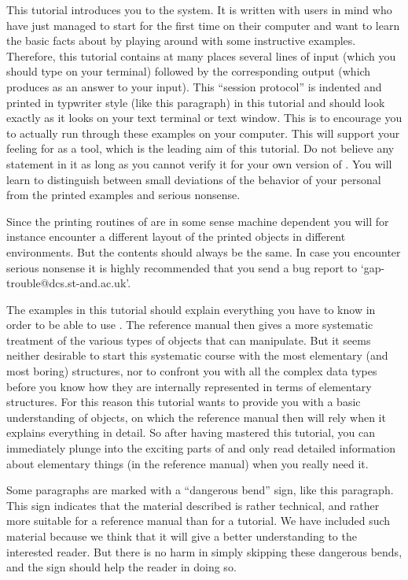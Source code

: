
This tutorial introduces you to  the {\GAP}  system.  It is written  with
users in mind who have just managed to start {\GAP} for the first time on
their computer and want to learn the basic facts  about {\GAP} by playing
around with some instructive  examples. Therefore, this tutorial contains
at many  places several lines of  input  (which you  should type  on your
terminal) followed by the corresponding output  (which {\GAP} produces as
an answer to your input).
\begintt
    This ``session protocol'' is indented and printed in typwriter style
    (like this paragraph) in this tutorial and should look exactly as it
    looks on your text terminal or text window.
\endtt
This is  to encourage you to actually  run through these examples on your
computer. This will support your  feeling for {\GAP}  as a tool, which is
the leading aim of this  tutorial. Do not believe any  statement in it as
long  as you cannot verify  it for your own  version of  {\GAP}. You will
learn to distinguish  between small  deviations of  the behavior of  your
personal {\GAP} from the printed examples and serious nonsense.

Since the printing routines of {\GAP} are in some sense machine dependent
you will for instance encounter a different layout of the printed objects
in different environments.  But the  contents should always be the  same.
In case you encounter serious nonsense  it is highly recommended that you
send a bug report to `gap-trouble@dcs.st-and.ac.uk'.

The examples in this tutorial should  explain everything you have to know
in order to be able to use {\GAP}. The reference manual then gives a more
systematic  treatment of  the various types  of objects  that  {\GAP} can
manipulate.  But it  seems neither  desirable   to start this  systematic
course with  the  most elementary (and most   boring) structures, nor  to
confront you with all the complex data types before you know how they are
internally represented in terms of elementary structures. For this reason
this tutorial wants to  provide you with a  basic understanding of {\GAP}
objects, on  which the reference manual  then will rely when  it explains
everything in detail.  So  after having mastered  this tutorial, you  can
immediately  plunge   into the exciting  parts  of  {\GAP} and  only read
detailed information about elementary   things (in the reference  manual)
when you really need it.

\danger  Some paragraphs are marked  with a ``dangerous bend'' sign, like
this paragraph. This sign indicates that the material described is rather
technical, and rather  more suitable  for  a reference manual  than for a
tutorial. We  have included such  material because we  think that it will
give a better  understanding to the interested   reader. But there  is no
harm in simply skipping  these dangerous bends,  and the sign should help
the reader in doing so.


